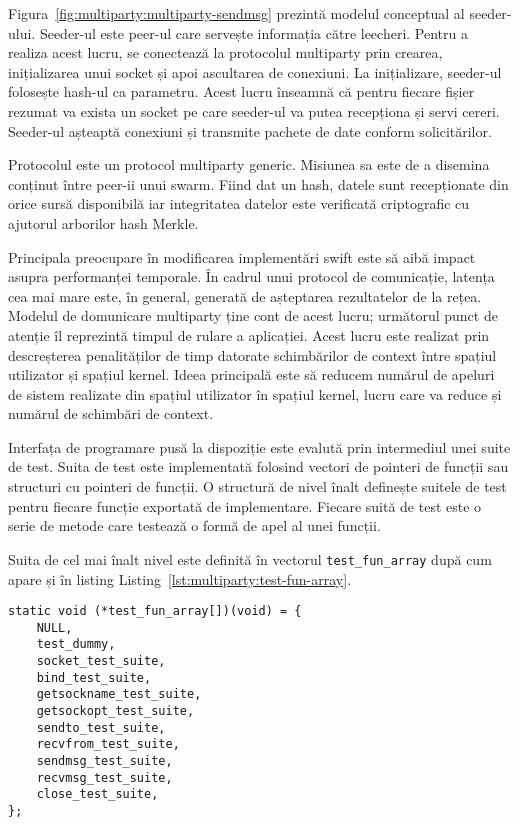Figura~\ref{fig:multiparty:multiparty-sendmsg} prezintă modelul conceptual al
seeder-ului. Seeder-ul este peer-ul care servește informația către leecheri.
Pentru a realiza acest lucru, se conectează la protocolul multiparty prin
crearea, inițializarea unui socket și apoi ascultarea de conexiuni. La
inițializare, seeder-ul folosește hash-ul ca parametru. Acest lucru înseamnă
că pentru fiecare fișier rezumat va exista un socket pe care seeder-ul va
putea recepționa și servi cereri. Seeder-ul așteaptă conexiuni și transmite
pachete de date conform solicitărilor.

Protocolul este un protocol multiparty generic. Misiunea sa este de a disemina
conținut între peer-ii unui swarm. Fiind dat un hash, datele sunt recepționate
din orice sursă disponibilă iar integritatea datelor este verificată
criptografic cu ajutorul arborilor hash Merkle.

Principala preocupare în modificarea implementări swift este să aibă impact
asupra performanței temporale. În cadrul unui protocol de comunicație, latența
cea mai mare este, în general, generată de așteptarea rezultatelor de la
rețea. Modelul de domunicare multiparty ține cont de acest lucru; următorul
punct de atenție îl reprezintă timpul de rulare a aplicației. Acest lucru este
realizat prin descreșterea penalităților de timp datorate schimbărilor de
context între spațiul utilizator și spațiul kernel. Ideea principală este să
reducem numărul de apeluri de sistem realizate din spațiul utilizator în
spațiul kernel, lucru care va reduce și numărul de schimbări de context.

Interfața de programare pusă la dispoziție este evalută prin intermediul unei
suite de test. Suita de test este implementată folosind vectori de pointeri de
funcții sau structuri cu pointeri de funcții.  O structură de nivel înalt
definește suitele de test pentru fiecare funcție exportată de implementare.
Fiecare suită de test este o serie de metode care testează o formă de apel
al unei funcții.

Suita de cel mai înalt nivel este definită în vectorul
\texttt{test\_fun\_array} după cum apare și în listing
Listing~\ref{lst:multiparty:test-fun-array}.

\lstset{language=C,caption=Test Suite Top-Level
Array,label=lst:multiparty:test-fun-array}
\begin{lstlisting}
static void (*test_fun_array[])(void) = {
    NULL,
    test_dummy,
    socket_test_suite,
    bind_test_suite,
    getsockname_test_suite,
    getsockopt_test_suite,
    sendto_test_suite,
    recvfrom_test_suite,
    sendmsg_test_suite,
    recvmsg_test_suite,
    close_test_suite,
};
\end{lstlisting}

